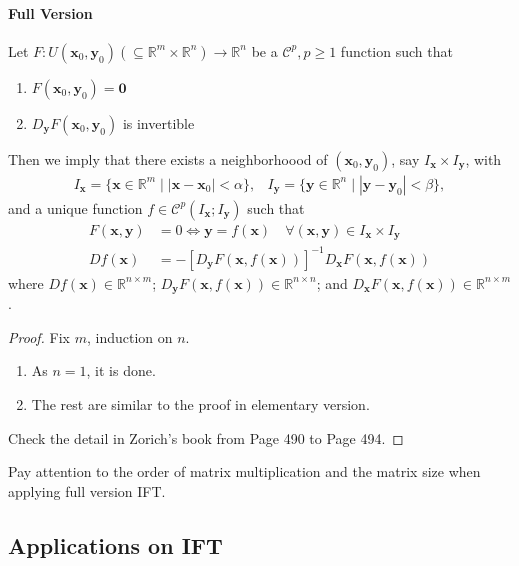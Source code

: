 \paragraph{Full Version}
Let $F: U(\bm x_0,\bm y_0)(\subseteq\mathbb{R}^m\times\mathbb{R}^n)\to\mathbb{R}^n$ be a $\mathcal{C}^p,p\ge1$ function such that
\begin{enumerate}
\item
$F(\bm x_0,\bm y_0)=\bm 0$
\item
$D_{\bm y}F(\bm x_0,\bm y_0)$ is invertible
\end{enumerate}
Then we imply that there exists a neighborhoood of $(\bm x_0,\bm y_0)$, say $I_{\bm x}\times I_{\bm y}$, with
\[
\begin{array}{ll}
I_{\bm x}=\{\bm x\in\mathbb{R}^m\mid |\bm x-\bm x_0|<\alpha\},
&
I_{\bm y}=\{\bm y\in\mathbb{R}^n\mid |\bm y-\bm y_0|<\beta\},
\end{array}
\]
and a unique function $f\in\mathcal{C}^p(I_{\bm x};I_{\bm y})$ such that
\begin{align*}
F(\bm x,\bm y)&=0\Longleftrightarrow
\bm y = f(\bm x)\quad \forall (\bm x,\bm y)\in I_{\bm x}\times I_{\bm y}\\
Df(\bm x) &= -[D_{\bm y}F(\bm x,f(\bm x))]^{-1}D_{\bm x}F(\bm x,f(\bm x))
\end{align*}
where $Df(\bm x)\in\mathbb{R}^{n\times m}$; $D_{\bm y}F(\bm x,f(\bm x))\in\mathbb{R}^{n\times n}$; and $D_{\bm x}F(\bm x,f(\bm x))\in\mathbb{R}^{n\times m}$.
\begin{proof}
Fix $m$, induction on $n$.
\begin{enumerate}
\item
As $n=1$, it is done.
\item
The rest are similar to the proof in elementary version.
\end{enumerate}
Check the detail in Zorich's book from Page 490 to Page 494.
\end{proof}
\begin{remark}
Pay attention to the order of matrix multiplication and the matrix size when applying full version IFT.
\end{remark}
\subsection{Applications on IFT}
